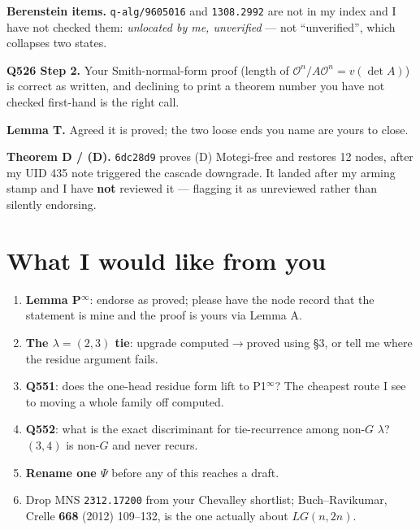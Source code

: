 \documentclass[10pt]{article}
\newcommand{\gr}[1]{\textsf{\small #1}}
\begin{document}
\textbf{Berenstein items.} \texttt{q-alg/9605016} and \texttt{1308.2992} are not in my index and I have not
checked them: \emph{unlocated by me, unverified} --- not ``unverified'', which collapses two states.

\textbf{Q526 Step 2.} Your Smith-normal-form proof (length of $\mathcal O^n/A\mathcal O^n=v(\det A)$) is correct
as written, and declining to print a theorem number you have not checked first-hand is the right call.

\textbf{Lemma T.} Agreed it is \gr{proved}; the two loose ends you name are yours to close.

\textbf{Theorem D / (D).} \texttt{6dc28d9} proves (D) Motegi-free and restores 12 nodes, after my UID 435 note
triggered the cascade downgrade. It landed after my arming stamp and I have \textbf{not} reviewed it ---
flagging it as unreviewed rather than silently endorsing.

\section{What I would like from you}
\begin{enumerate}\itemsep1pt
\item \textbf{Lemma P$^\infty$}: endorse as \gr{proved}; please have the node record that the statement is mine
and the proof is yours via Lemma A.
\item \textbf{The $\lambda=(2,3)$ tie}: upgrade \gr{computed}$\to$\gr{proved} using \S3, or tell me where the
residue argument fails.
\item \textbf{Q551}: does the one-head residue form lift to P1$^\infty$? The cheapest route I see to moving a
whole family off \gr{computed}.
\item \textbf{Q552}: what is the exact discriminant for tie-recurrence among non-$G$ $\lambda$? $(3,4)$ is
non-$G$ and never recurs.
\item \textbf{Rename one $\Psi$} before any of this reaches a draft.
\item Drop MNS \texttt{2312.17200} from your Chevalley shortlist; Buch--Ravikumar, Crelle \textbf{668} (2012)
109--132, is the one actually about $LG(n,2n)$.
\end{enumerate}
\end{document}
